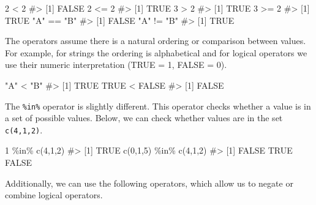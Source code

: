 \documentclass[
  letterpaper,
]{krantz}
\makeatletter
\newenvironment{Shaded}{\begin{snugshade}}{\end{snugshade}}
\newcommand{\CommentTok}[1]{\textcolor[rgb]{0.37,0.37,0.37}{#1}}
\newcommand{\ConstantTok}[1]{\textcolor[rgb]{0.56,0.35,0.01}{#1}}
\newcommand{\DecValTok}[1]{\textcolor[rgb]{0.68,0.00,0.00}{#1}}
\newcommand{\FunctionTok}[1]{\textcolor[rgb]{0.28,0.35,0.67}{#1}}
\newcommand{\NormalTok}[1]{\textcolor[rgb]{0.00,0.23,0.31}{#1}}
\newcommand{\SpecialCharTok}[1]{\textcolor[rgb]{0.37,0.37,0.37}{#1}}
\newcommand{\StringTok}[1]{\textcolor[rgb]{0.13,0.47,0.30}{#1}}
\newenvironment{kframe}{%
\medskip{}
\setlength{\fboxsep}{.8em}
 \def\at@end@of@kframe{}%
 \ifinner\ifhmode%
  \def\at@end@of@kframe{\end{minipage}}%
  \begin{minipage}{\columnwidth}%
 \fi\fi%
 \def\FrameCommand##1{\hskip\@totalleftmargin \hskip-\fboxsep
 \colorbox{shadecolor}{##1}\hskip-\fboxsep
     \hskip-\linewidth \hskip-\@totalleftmargin \hskip\columnwidth}%
 \MakeFramed {\advance\hsize-\width
   \@totalleftmargin\z@ \linewidth\hsize
   \@setminipage}}%
 {\par\unskip\endMakeFramed%
 \at@end@of@kframe}
\renewenvironment{Shaded}{\begin{kframe}}{\end{kframe}}
\makeatother
\begin{document}
\begin{Shaded}
\begin{Highlighting}[]
\DecValTok{2} \SpecialCharTok{\textless{}} \DecValTok{2}
\CommentTok{\#\textgreater{} [1] FALSE}
\DecValTok{2} \SpecialCharTok{\textless{}=} \DecValTok{2}
\CommentTok{\#\textgreater{} [1] TRUE}
\DecValTok{3} \SpecialCharTok{\textgreater{}} \DecValTok{2}
\CommentTok{\#\textgreater{} [1] TRUE}
\DecValTok{3} \SpecialCharTok{\textgreater{}=} \DecValTok{2}
\CommentTok{\#\textgreater{} [1] TRUE}
\StringTok{"A"} \SpecialCharTok{==} \StringTok{"B"}
\CommentTok{\#\textgreater{} [1] FALSE}
\StringTok{"A"} \SpecialCharTok{!=} \StringTok{"B"}
\CommentTok{\#\textgreater{} [1] TRUE}
\end{Highlighting}
\end{Shaded}

The operators assume there is a natural ordering or comparison between
values. For example, for strings the ordering is alphabetical and for
logical operators we use their numeric interpretation (TRUE = 1, FALSE =
0).

\begin{Shaded}
\begin{Highlighting}[]
\StringTok{"A"} \SpecialCharTok{\textless{}} \StringTok{"B"}
\CommentTok{\#\textgreater{} [1] TRUE}
\ConstantTok{TRUE} \SpecialCharTok{\textless{}} \ConstantTok{FALSE}
\CommentTok{\#\textgreater{} [1] FALSE}
\end{Highlighting}
\end{Shaded}

The \texttt{\%in\%} operator is slightly different. This operator checks
whether a value is in a set of possible values. Below, we can check
whether values are in the set \texttt{c(4,1,2)}.

\begin{Shaded}
\begin{Highlighting}[]
\DecValTok{1} \SpecialCharTok{\%in\%} \FunctionTok{c}\NormalTok{(}\DecValTok{4}\NormalTok{,}\DecValTok{1}\NormalTok{,}\DecValTok{2}\NormalTok{)}
\CommentTok{\#\textgreater{} [1] TRUE}
\FunctionTok{c}\NormalTok{(}\DecValTok{0}\NormalTok{,}\DecValTok{1}\NormalTok{,}\DecValTok{5}\NormalTok{) }\SpecialCharTok{\%in\%} \FunctionTok{c}\NormalTok{(}\DecValTok{4}\NormalTok{,}\DecValTok{1}\NormalTok{,}\DecValTok{2}\NormalTok{)}
\CommentTok{\#\textgreater{} [1] FALSE  TRUE FALSE}
\end{Highlighting}
\end{Shaded}

Additionally, we can use the following operators, which allow us to
negate or combine logical operators.
\end{document}
